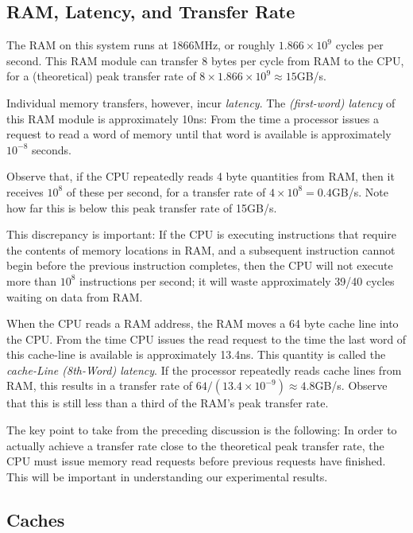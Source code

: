 \documentclass{patmorin}
\begin{document}


\subsection{RAM, Latency, and Transfer Rate}

The RAM on this system runs at 1866MHz, or roughly $1.866\times10^9$
cycles per second.  This RAM module can transfer 8 bytes per cycle
from RAM to the CPU, for a (theoretical) peak transfer rate of $8\times
1.866\times10^9\approx 15$GB/s.

Individual memory transfers, however, incur \emph{latency}.  The
\emph{(first-word) latency} of this RAM module is approximately 10ns:
From the time a processor issues a request to read a word of memory
until that word is available is approximately $10^{-8}$ seconds.

Observe that, if the CPU repeatedly reads 4 byte quantities from RAM,
then it receives $10^8$ of these per second, for a transfer rate of
$4\times 10^8=0.4$GB/s.  Note how far this is below this peak transfer
rate of 15GB/s.

This discrepancy is important: If the CPU is executing instructions
that require the contents of memory locations in RAM, and a subsequent
instruction cannot begin before the previous instruction completes,
then the CPU will not execute more than $10^8$ instructions per second;
it will waste approximately 39/40 cycles waiting on data from RAM.

When the CPU reads a RAM address, the RAM moves a 64 byte cache line
into the CPU. From the time CPU issues the read request to the time
the last word of this cache-line is available is approximately 13.4ns.
This quantity is called the \emph{cache-Line (8th-Word) latency}.
If the processor repeatedly reads cache lines from RAM, this results in a
transfer rate of $64 / (13.4\times10^{-9}) \approx 4.8$GB/s.  Observe that
this is still less than a third of the RAM's peak transfer rate.

The key point to take from the preceding discussion is the following: In
order to actually achieve a transfer rate close to the theoretical peak
transfer rate, the CPU must issue memory read requests before previous
requests have finished.  This will be important in understanding our
experimental results.

\subsection{Caches}
\end{document}
